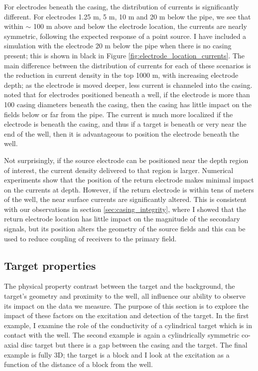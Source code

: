 For electrodes beneath the casing, the distribution of currents is significantly different. For electrodes 1.25 m, 5 m, 10 m and 20 m below the pipe, we see that within $\sim$ 100 m above and below the electrode location, the currents are nearly symmetric, following the expected response of a point source. I have included a simulation with the electrode 20 m below the pipe when there is no casing present; this is shown in black in Figure \ref{fig:electrode_location_currents}. The main difference between the distribution of currents for each of these scenarios is the reduction in current density in the top 1000 m, with increasing electrode depth; as the electrode is moved deeper, less current is channeled into the casing. \cite{Schenkel1990} noted that for electrodes positioned beneath a well, if the electrode is more than 100 casing diameters beneath the casing, then the casing has little impact on the fields below or far from the pipe. The current is much more localized if the electrode is beneath the casing, and thus if a target is beneath or very near the end of the well, then it is advantageous to position the electrode beneath the well.

Not surprisingly, if the source electrode can be positioned near the depth region of interest, the current density delivered to that region is larger. Numerical experiments show that the position of the return electrode makes minimal impact on the currents at depth. However, if the return electrode is within tens of meters of the well, the near surface currents are significantly altered. This is consistent with our observations in section \ref{sec:casing_integrity}, where I showed that the return electrode location has little impact on the magnitude of the secondary signals, but its position alters the geometry of the source fields and this can be used to reduce coupling of receivers to the primary field.


\subsection{Target properties}
The physical property contrast between the target and the background, the target's geometry and proximity to the well, all influence our ability to observe its impact on the data we measure. The purpose of this section is to explore the impact of these factors on the excitation and detection of the target. In the first example, I examine the role of the conductivity of a cylindrical target which is in contact with  the well. The second example is again a cylindrically symmetric co-axial disc target but there is a gap between the casing and the target. The final example is fully 3D; the target is a block and I look at the excitation as a function of the distance of a block from the well.

